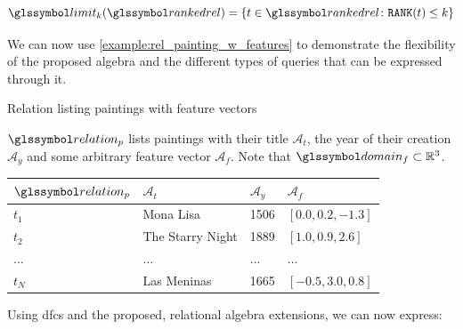 \begin{equation}
    \limit_k(\rankedrel) = \{ t \in \rankedrel \colon \mathtt{RANK}(t) \leq k \}
\end{equation}

We can now use \cref{example:rel_painting_w_features} to demonstrate the flexibility of the proposed algebra and the different types of queries that can be expressed through it.

\begin{example}[label=example:rel_painting_w_features]{Relation listing paintings with feature vectors}{}
    
    $\relation_{p}$ lists paintings with their title $\mathcal{A}_{t}$, the year of their creation $\mathcal{A}_{y}$ and some arbitrary feature vector $\mathcal{A}_{f}$. Note that $\domain_{f} \subset \mathbb{R}^{3}$.
        
    \begin{center}
        \begin{tabular}{ l || l | l | l |}
            $\relation_{p}$ & $\mathcal{A}_{t}$  & $\mathcal{A}_{y}$  & $\mathcal{A}_{f}$ \\ 
            \hline
            \hline
            $t_1$ & Mona Lisa & 1506 & $\left\lbrack 0.0, 0.2, -1.3 \right\rbrack$ \\
            \hline
            $t_2$ & The Starry Night & 1889 & $\left\lbrack 1.0, 0.9, 2.6 \right\rbrack$ \\
            \hline
            ... & ... & ... & ... \\
            \hline
            $t_N$ & Las Meninas & 1665 & $\left\lbrack -0.5, 3.0, 0.8 \right\rbrack$ \\
            \hline
        \end{tabular}
    \end{center}

    Using \acrshort{dfc}s and the proposed, relational algebra extensions, we can now express:


\end{example}
